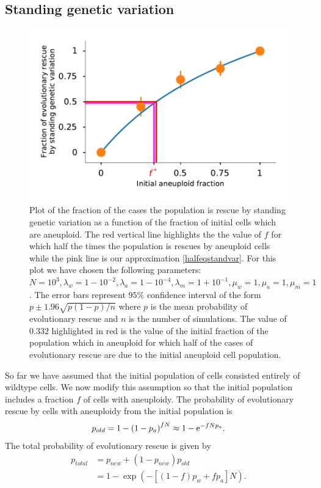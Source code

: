 \documentclass[12pt]{extarticle}
\newcommand{\e}{{\rm e}}
\begin{document}
\subsection*{Standing genetic variation}
\begin{figure}[!t]
 \vspace*{1\baselineskip}
\includegraphics[width=1\textwidth]{Figures/FractionPlot.pdf}
\caption{Plot of the fraction of the cases the population is rescue by standing genetic variation as a function of the fraction of initial cells which are aneuploid. The red vertical line highlights the the value of $f$ for which half the times the population is rescues by aneuploid cells while the pink line is our approximation \eqref{halfeqstandvar}. For this plot we have chosen the following parameters: $N=10^3, \lambda_w=1-10^{-2}, \lambda_a=1-10^{-4},\lambda_m=1+10^{-1},\mu_w=1,\mu_a=1,\mu_m=1$. The error bars represent $95\%$ confidence interval of the form $p\pm1.96\sqrt{p\left(1-p\right)/n}$ where $p$ is the mean probability of evolutionary rescue and $n$ is the number of simulations. The value of $0.332$ highlighted in red is the value of the initial fraction of the population which in aneuploid for which half of the cases of evolutionary rescue are due to the initial aneuploid cell population.}
\label{FractionPlot}
\end{figure}
So far we have assumed that the initial population of cells consisted entirely of wildtype cells.
We now modify this assumption so that the initial population includes a fraction $f$ of cells with aneuploidy.
The probability of evolutionary rescue by cells with aneuploidy from the initial population is
\begin{equation*}
p_{old} = 1-\left(1-p_a\right)^{fN}\approx 1-\e^{-fNp_a}.
\end{equation*}
The total probability of evolutionary rescue is given by
\begin{align}\nonumber
p_{total} 	&= p_{new}+\left(1-p_{new}\right)p_{old}\\
			&= 1-\exp\left(-\left[\left(1-f\right)p_w + fp_a\right]N\right) .
\end{align}
\end{document}
